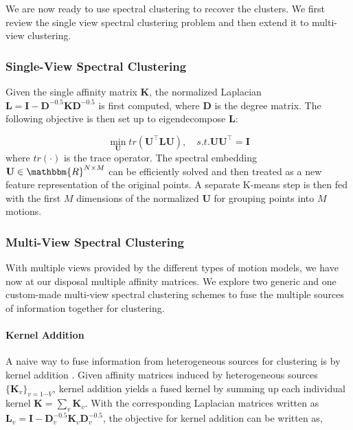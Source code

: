 \documentclass[10pt,twocolumn,letterpaper]{article}
\newcommand{\matr}[1]{\mathbf{#1}}
\begin{document}
We are now ready to use spectral clustering to recover the
clusters. We first review the single view spectral clustering
problem and then extend it to multi-view clustering.

\vspace{-0.2cm}
\subsubsection{Single-View Spectral Clustering}



Given the single affinity matrix $\matr{K}$, the normalized Laplacian $\matr{L}=\matr{I}-\matr{D}^{-0.5}\matr{K}\matr{D}^{-0.5}$ is first computed, where $\matr{D}$ is the degree matrix. The following objective is then set up to eigendecompose $\matr{L}$: 

\begin{equation}
\min\limits_{\matr{U}} tr\left(\matr{U}^\top \matr{L} \matr{U}\right), \quad s.t. \matr{U}\matr{U}^\top=\matr{I}
\end{equation}
where $tr\left(\cdot\right)$ is the trace operator. The spectral embedding $\matr{U}\in\mathbbm{R}^{N\times M}$ can be efficiently solved and then treated as a new feature representation of the original points. A separate K-means step is then fed with the first $M$ dimensions of the normalized $\matr{U}$ for grouping points into $M$ motions.

\subsubsection{Multi-View Spectral Clustering}

With multiple views provided by the different types of motion models, we have now at our disposal multiple affinity matrices. We explore two generic and one custom-made multi-view spectral clustering schemes to fuse the multiple sources of information together for clustering.
\vspace{-0.2cm}
\paragraph{Kernel Addition} A naive way to fuse information from heterogeneous sources for clustering is by kernel addition \cite{Kumar2011}. Given affinity matrices induced by heterogeneous sources $\{\matr{K}_v\}_{v=1\cdots V}$, kernel addition yields a fused kernel by summing up each individual kernel $\matr{K}=\sum_v \matr{K}_v$. With the corresponding Laplacian matrices written as $\matr{L}_v=\matr{I}-\matr{D}^{-0.5}_v\matr{K}_v\matr{D}^{-0.5}_v$, the objective for kernel addition can be written as,
\end{document}
